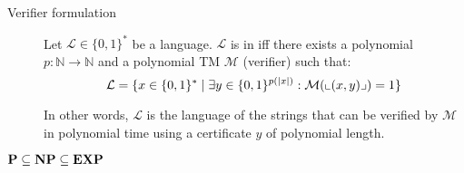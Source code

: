 \begin{description}
\begin{description}
            \item[Verifier formulation] 
                Let $\mathcal{L} \in \{0, 1\}^*$ be a language.
                $\mathcal{L}$ is in \NP iff there exists 
                a polynomial $p: \mathbb{N} \rightarrow \mathbb{N}$ and 
                a polynomial TM $\mathcal{M}$ (verifier) such that:
                \[ \mathcal{L} = \{ x \in \{0, 1\}^* \mid \exists y \in \{0, 1\}^{p(\vert x \vert)}: \mathcal{M}({\llcorner{(x, y)}\lrcorner}) = 1 \} \]
        
                In other words, $\mathcal{L}$ is the language of the strings that can be verified by $\mathcal{M}$ in polynomial time
                using a certificate $y$ of polynomial length.
        \end{description}
        
\end{description}

\begin{theorem}
    $\textbf{P} \subseteq \textbf{NP} \subseteq \textbf{EXP}$
\end{theorem}